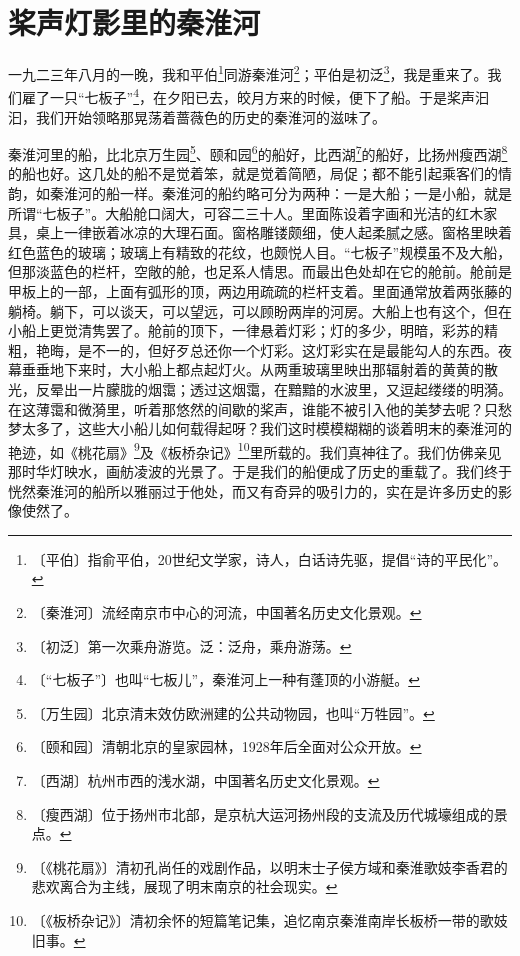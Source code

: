 \documentclass[12pt,UTF-8,openany]{ctexbook}
\begin{document}
\chapter{桨声灯影里的秦淮河}

\begin{normalsize}
    
    一九二三年八月的一晚，我和平伯\footnote{〔平伯〕指俞平伯，20世纪文学家，诗人，白话诗先驱，提倡“诗的平民化”。}同游秦淮河\footnote{〔秦淮河〕流经南京市中心的河流，中国著名历史文化景观。}；平伯是初泛\footnote{〔初泛〕第一次乘舟游览。泛：泛舟，乘舟游荡。}，我是重来了。我们雇了一只“七板子”\footnote{〔“七板子”〕也叫“七板儿”，秦淮河上一种有蓬顶的小游艇。}，在夕阳已去，皎月方来的时候，便下了船。于是桨声汩汩，我们开始领略那晃荡着蔷薇色的历史的秦淮河的滋味了。
    
    秦淮河里的船，比北京万生园\footnote{〔万生园〕北京清末效仿欧洲建的公共动物园，也叫“万牲园”。}、颐和园\footnote{〔颐和园〕清朝北京的皇家园林，1928年后全面对公众开放。}的船好，比西湖\footnote{〔西湖〕杭州市西的浅水湖，中国著名历史文化景观。}的船好，比扬州瘦西湖\footnote{〔瘦西湖〕位于扬州市北部，是京杭大运河扬州段的支流及历代城壕组成的景点。}的船也好。这几处的船不是觉着笨，就是觉着简陋，局促；都不能引起乘客们的情韵，如秦淮河的船一样。秦淮河的船约略可分为两种：一是大船；一是小船，就是所谓“七板子”。大船舱口阔大，可容二三十人。里面陈设着字画和光洁的红木家具，桌上一律嵌着冰凉的大理石面。窗格雕镂颇细，使人起柔腻之感。窗格里映着红色蓝色的玻璃；玻璃上有精致的花纹，也颇悦人目。“七板子”规模虽不及大船，但那淡蓝色的栏杆，空敞的舱，也足系人情思。而最出色处却在它的舱前。舱前是甲板上的一部，上面有弧形的顶，两边用疏疏的栏杆支着。里面通常放着两张藤的躺椅。躺下，可以谈天，可以望远，可以顾盼两岸的河房。大船上也有这个，但在小船上更觉清隽罢了。舱前的顶下，一律悬着灯彩；灯的多少，明暗，彩苏的精粗，艳晦，是不一的，但好歹总还你一个灯彩。这灯彩实在是最能勾人的东西。夜幕垂垂地下来时，大小船上都点起灯火。从两重玻璃里映出那辐射着的黄黄的散光，反晕出一片朦胧的烟霭；透过这烟霭，在黯黯的水波里，又逗起缕缕的明漪。在这薄霭和微漪里，听着那悠然的间歇的桨声，谁能不被引入他的美梦去呢？只愁梦太多了，这些大小船儿如何载得起呀？我们这时模模糊糊的谈着明末的秦淮河的艳迹，如《桃花扇》\footnote{〔《桃花扇》〕清初孔尚任的戏剧作品，以明末士子侯方域和秦淮歌妓李香君的悲欢离合为主线，展现了明末南京的社会现实。}及《板桥杂记》\footnote{〔《板桥杂记》〕清初余怀的短篇笔记集，追忆南京秦淮南岸长板桥一带的歌妓旧事。}里所载的。我们真神往了。我们仿佛亲见那时华灯映水，画舫凌波的光景了。于是我们的船便成了历史的重载了。我们终于恍然秦淮河的船所以雅丽过于他处，而又有奇异的吸引力的，实在是许多历史的影像使然了。
    

\end{normalsize}
\end{document}
